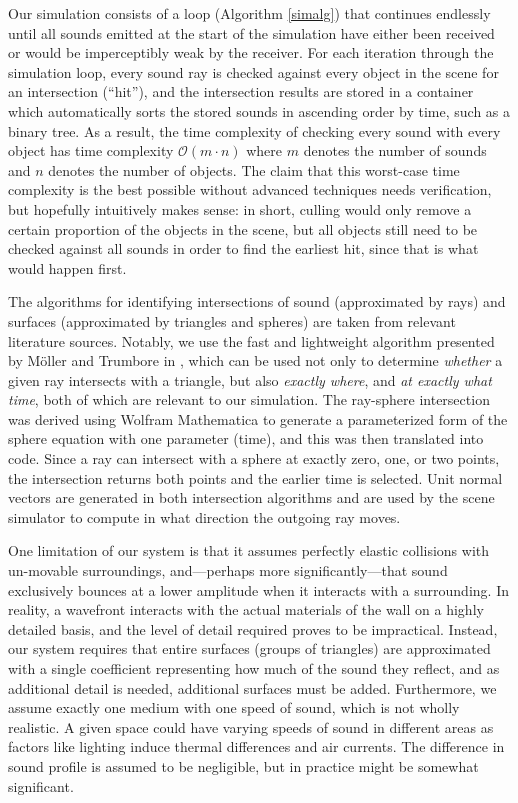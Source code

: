 \documentclass[10pt]{article}
\begin{document}
Our simulation consists of a loop (Algorithm \ref{simalg}) that continues
endlessly until all sounds emitted at the start of the simulation have either
been received or would be imperceptibly weak by the receiver.  For each
iteration through the simulation loop, every sound ray is checked against every
object in the scene for an intersection (``hit''), and the intersection results
are stored in a container which automatically sorts the stored sounds in
ascending order by time, such as a binary tree.  As a result, the time
complexity of checking every sound with every object has time complexity
$\mathcal{O}(m \cdot n)$ where $m$ denotes the number of sounds and $n$ denotes
the number of objects.  The claim that this worst-case time complexity is the
best possible without advanced techniques needs verification, but hopefully
intuitively makes sense: in short, culling would only remove a certain
proportion of the objects in the scene, but all objects still need to be checked
against all sounds in order to find the earliest hit, since that is what would
happen first.

The algorithms for identifying intersections of sound (approximated by rays) and
surfaces (approximated by triangles and spheres) are taken from relevant
literature sources.  Notably, we use the fast and lightweight algorithm
presented by M\"oller and Trumbore in \cite{raytrialgo}, which can be used not
only to determine \emph{whether} a given ray intersects with a triangle, but
also \emph{exactly where}, and \emph{at exactly what time}, both of which are
relevant to our simulation.  The ray-sphere intersection was derived using
Wolfram Mathematica to generate a parameterized form of the sphere equation with
one parameter (time), and this was then translated into code.  Since a ray can
intersect with a sphere at exactly zero, one, or two points, the intersection
returns both points and the earlier time is selected.  Unit normal vectors are
generated in both intersection algorithms and are used by the scene simulator to
compute in what direction the outgoing ray moves.

One limitation of our system is that it assumes perfectly elastic collisions
with un-movable surroundings, and---perhaps more significantly---that sound
exclusively bounces at a lower amplitude when it interacts with a surrounding.
In reality, a wavefront interacts with the actual materials of the wall on a
highly detailed basis, and the level of detail required proves to be
impractical.  Instead, our system requires that entire surfaces (groups of
triangles) are approximated with a single coefficient representing how much of
the sound they reflect, and as additional detail is needed, additional surfaces
must be added.  Furthermore, we assume exactly one medium with one speed of
sound, which is not wholly realistic.  A given space could have varying speeds
of sound in different areas as factors like lighting induce thermal differences
and air currents.  The difference in sound profile is assumed to be negligible,
but in practice might be somewhat significant.
\end{document}
